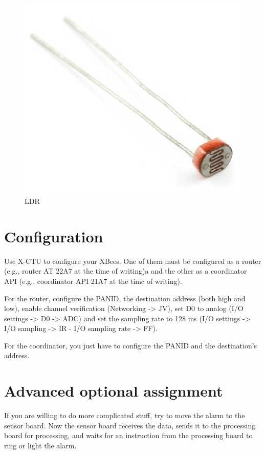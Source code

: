 \begin{figure}[htbp]
  \centering
  \includegraphics[width=0.3\linewidth]{figures/ldr.eps}
  \caption{LDR}
  \label{fig:blinkingLEDLayout}
\end{figure}

\section{Configuration}
Use X-CTU to configure your XBees.
One of them must be configured as a router (e.g., router AT 22A7 at the time of writing)a and the other as a coordinator API (e.g., coordinator API 21A7 at the time of writing).

For the router, configure the PANID, the destination address (both high and low), enable channel verification (Networking -> JV), set D0 to analog (I/O settings -> D0 -> ADC) and set the sampling rate to 128 ms (I/O settings -> I/O sampling -> IR - I/O sampling rate -> FF).

For the coordinator, you just have to configure the PANID and the destination's address.

\section{Advanced optional assignment}

If you are willing to do more complicated stuff, try to move the alarm to the sensor board. 
Now the sensor board receives the data, sends it to the processing board for processing, and waits for an instruction from the processing board to ring or light the alarm.
